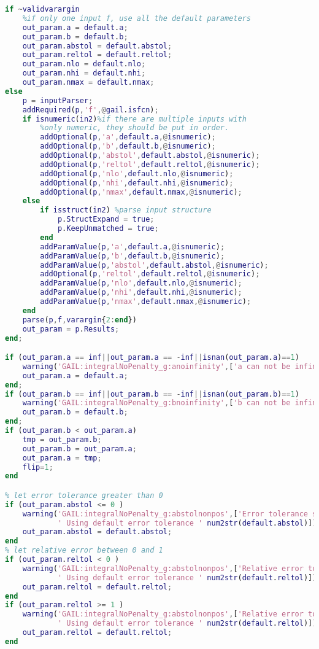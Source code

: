\documentclass{iitthesis}
\begin{document}
\begin{lstlisting}[language=Matlab]
if ~validvarargin
    %if only one input f, use all the default parameters
    out_param.a = default.a;
    out_param.b = default.b;
    out_param.abstol = default.abstol;
    out_param.reltol = default.reltol;
    out_param.nlo = default.nlo;
    out_param.nhi = default.nhi;    
    out_param.nmax = default.nmax;
else
    p = inputParser;
    addRequired(p,'f',@gail.isfcn);
    if isnumeric(in2)%if there are multiple inputs with
        %only numeric, they should be put in order.
        addOptional(p,'a',default.a,@isnumeric);
        addOptional(p,'b',default.b,@isnumeric);
        addOptional(p,'abstol',default.abstol,@isnumeric);
        addOptional(p,'reltol',default.reltol,@isnumeric);
        addOptional(p,'nlo',default.nlo,@isnumeric);
        addOptional(p,'nhi',default.nhi,@isnumeric);
        addOptional(p,'nmax',default.nmax,@isnumeric);
    else
        if isstruct(in2) %parse input structure
            p.StructExpand = true;
            p.KeepUnmatched = true;
        end
        addParamValue(p,'a',default.a,@isnumeric);
        addParamValue(p,'b',default.b,@isnumeric);
        addParamValue(p,'abstol',default.abstol,@isnumeric);
        addOptional(p,'reltol',default.reltol,@isnumeric);
        addParamValue(p,'nlo',default.nlo,@isnumeric);
        addParamValue(p,'nhi',default.nhi,@isnumeric);
        addParamValue(p,'nmax',default.nmax,@isnumeric);
    end
    parse(p,f,varargin{2:end})
    out_param = p.Results;
end;

if (out_param.a == inf||out_param.a == -inf||isnan(out_param.a)==1)
    warning('GAIL:integralNoPenalty_g:anoinfinity',['a can not be infinity nor NaN. Use default a = ' num2str(default.a)])
    out_param.a = default.a;
end;
if (out_param.b == inf||out_param.b == -inf||isnan(out_param.b)==1)
    warning('GAIL:integralNoPenalty_g:bnoinfinity',['b can not be infinity not Nan. Use default b = ' num2str(default.b)])
    out_param.b = default.b;
end;
if (out_param.b < out_param.a)
    tmp = out_param.b;
    out_param.b = out_param.a;
    out_param.a = tmp;
    flip=1;
end

% let error tolerance greater than 0
if (out_param.abstol <= 0 )
    warning('GAIL:integralNoPenalty_g:abstolnonpos',['Error tolerance should be greater than 0.' ...
            ' Using default error tolerance ' num2str(default.abstol)])
    out_param.abstol = default.abstol;
end
% let relative error between 0 and 1
if (out_param.reltol < 0 )
    warning('GAIL:integralNoPenalty_g:abstolnonpos',['Relative error tolerance should be between 0 and 1.' ...
            ' Using default error tolerance ' num2str(default.reltol)])
    out_param.reltol = default.reltol;
end
if (out_param.reltol >= 1 )
    warning('GAIL:integralNoPenalty_g:abstolnonpos',['Relative error tolerance should be between 0 and 1.' ...
            ' Using default error tolerance ' num2str(default.reltol)])
    out_param.reltol = default.reltol;
end


\end{lstlisting}
\end{document}
